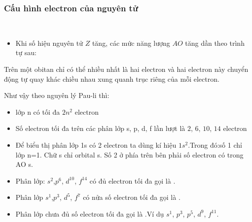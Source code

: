 \subsubsection{Cấu hình electron của nguyên tử}
\\
\begin{tomtat}
	\begin{itemize}
		\item Khi số hiệu nguyên tử $Z$ tăng, các mức năng lượng $AO$ tăng dần theo trình tự sau:
	\end{itemize}
	\centering{}
\end{tomtat}
\begin{ghinho}
	Trên một obitan chỉ có thể nhiều nhất là hai electron và hai electron này chuyển động tự quay khác chiều nhau xung quanh trục riêng của mỗi electron.
\end{ghinho}

Như vậy theo nguyên lý Pau-li thì:
\begin{itemize}[wide=0.65cm]
	\item lớp n có tối đa $2n^2$ electron
	\item Số electron tối đa trên các phân lớp s, p, d, f lần lượt là $2$, $6$, $10$, $14$ electron
\end{itemize}

\begin{hopvidu}[\maunhan]
	\begin{itemize}[wide=0.65cm,leftmargin=0.65cm]
		\item Để biểu thị phân lớp 1s có 2 electron  ta dùng kí hiệu $1s^2$.Trong đó:số 1 chỉ lớp n=1. Chữ s chỉ orbital s. Số 2 ở phía trên bên phải số electron có trong AO s.
		\item Phân lớp: $s^2$,$p^6$, $d^{10}$, $f^{14}$ có đủ electron tối đa gọi là .
		\item Phân lớp $s^1$,$p^3$, $d^5$, $f^7$ có nửa số electron tối đa gọi là .
		\item Phân lớp chưa đủ số electron tối đa gọi là .Ví dụ $s^1$, $p^3$, $p^5$, $d^9$, $f^{11}$.
	\end{itemize}
\end{hopvidu}

